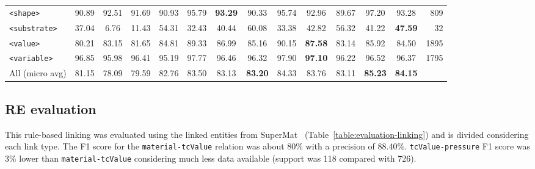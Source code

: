 \begin{table}
{\begin{tabular}{l ccc ccc ccc ccc r}
        \texttt{<shape>}       & 90.89                            & 92.51                                     & 91.69                                              & 90.93      & 95.79      & \textbf{93.29} & 90.33          & 95.74      & 92.96          & 89.67      & 97.20          & 93.28          & 809  \\
        \texttt{<substrate>}   & 37.04                            & 6.76                                      & 11.43                                              & 54.31      & 32.43      & 40.44          & 60.08          & 33.38      & 42.82          & 56.32      & 41.22          & \textbf{47.59} & 32   \\
        \texttt{<value>}       & 80.21                            & 83.15                                     & 81.65                                              & 84.81      & 89.33      & 86.99          & 85.16          & 90.15      & \textbf{87.58} & 83.14      & 85.92          & 84.50          & 1895 \\
        \texttt{<variable>}    & 96.85                            & 95.98                                     & 96.41                                              & 95.19      & 97.77      & 96.46          & 96.32          & 97.90      & \textbf{97.10} & 96.22      & 96.52          & 96.37          & 1795 \\
        \midrule
        All (micro avg)        & 81.15                            & 78.09                                     & 79.59                                              & 82.76      & 83.50      & 83.13          & \textbf{83.20} & 84.33      & 83.76          & 83.11      & \textbf{85.23} & \textbf{84.15} &      \\
        \bottomrule
    \end{tabular}
    }
    
    \label{tab:evaluation-10fold-material-parser}
\end{table}

\subsection{RE evaluation}

This rule-based linking was evaluated using the linked entities from SuperMat~\cite{foppiano2021supermat} (Table~\ref{table:evaluation-linking}) and is divided considering each link type.
The F1 score for the \texttt{material-tcValue} relation was about 80\% with a precision of 88.40\%. 
\texttt{tcValue-pressure} F1 score was 3\% lower than  \texttt{material-tcValue} considering much less data available (support was 118 compared with 726).


